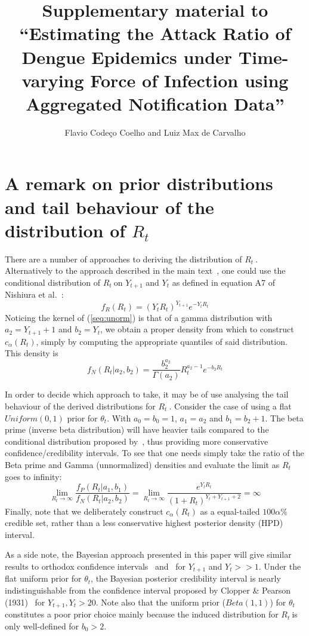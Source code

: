 \documentclass[a4paper,10pt]{article}
\title{Supplementary material to ``Estimating the Attack Ratio of Dengue 
Epidemics under Time-varying 
Force of Infection using Aggregated Notification Data''}
\author{Flavio Code\c{c}o Coelho and Luiz Max de Carvalho}
\def \rr {$R_{t}\:$}
\begin{document}
\maketitle

\section*{A remark on prior distributions and tail behaviour of the 
distribution of $R_t$}
\label{sec:tails}
There are a number of approaches to deriving the distribution of \rr.
Alternatively to the approach described in the main text~\cite{mantel}, one 
could use the conditional distribution of \rr on 
$Y_{t+1}$ and $Y_t$ as defined in equation A7 of Nishiura et 
al.~\cite{nishiura}:
\begin{equation}
\label{seq:unorm}
f_{R}(R_{t}) = (Y_tR_{t})^{Y_{t+1}} e^{-Y_tR_{t}}
\end{equation}
Noticing the kernel of (\ref{seq:unorm}) is that of a gamma distribution with 
$a_2 = Y_{t+1}+1$ and $b_2 = Y_t$, we obtain a proper density from which to 
construct $c_{\alpha}(R_t)$, simply by computing the appropriate quantiles of 
said distribution.
 This density is
\begin{equation}
\label{seq:densityNishiura}
f_N(R_t| a_2, b_2) =  \frac{b_2^{a_2}}{\Gamma(a_2)} R_t^{a_2-1} e^{-b_2 R_t}
\end{equation}

In order to decide which approach to take, it may be of use analysing the 
tail behaviour of the derived distributions for \rr. 
Consider the case of using a flat $Uniform(0, 1)$ prior for $\theta_t$.
With $a_0 = b_0 = 1$, $a_1 = a_2$ and $b_1 = b_2 + 1$.
The beta prime (inverse beta distribution) will have heavier tails compared to 
the conditional distribution proposed by~\cite{nishiura}, thus providing more 
conservative confidence/credibility intervals.
To see that one needs simply take the ratio of the Beta prime and Gamma 
(unnormalized) densities and evaluate the limit as $R_t$ goes to infinity:
\begin{equation}
 \label{seq:densityratio}
 \lim_{R_t\to\infty}\frac{f_P(R_t| a_1, b_1)}{f_N(R_t| a_2, b_2)} =  
\lim_{R_t\to\infty}\frac{e^{Y_{t}R_t}}{(1 +R_t)^{Y_{t} + Y_{t +1}+2}} = \infty
\end{equation}
Finally, note that we deliberately construct $c_{\alpha}(R_{t})$ as a 
equal-tailed $100\alpha\%$ credible set, rather than a less conservative 
highest posterior density (HPD) interval.

As a side note, the Bayesian approach presented in this 
paper will give similar results to orthodox confidence intervals~\cite{wilson} 
and~\cite{clopper} for $Y_{t+1}$ and $Y_t >> 1$.
Under the flat  uniform prior for $\theta_t$, the Bayesian posterior 
credibility 
interval is nearly indistinguishable from the confidence interval proposed by 
Clopper \& Pearson (1931)~\cite{clopper} for $Y_{t+1}, Y_t > 20$.
Note also that the uniform prior ($Beta(1, 1)$) for $\theta_t$ constitutes a 
poor 
prior 
choice mainly because the induced distribution for \rr is only well-defined for 
$b_0 > 2$.
\end{document}
